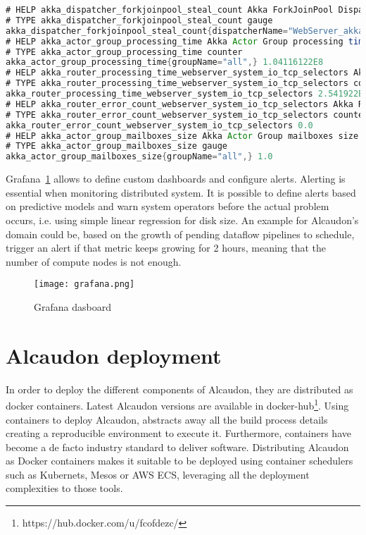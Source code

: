 \begin{lstlisting}[language=scala, frame=trBL, label=code:metricsSample, float=ht, caption = {Example of Alcaudon exposed metrics}]
# HELP akka_dispatcher_forkjoinpool_steal_count Akka ForkJoinPool Dispatcher Steal Count
# TYPE akka_dispatcher_forkjoinpool_steal_count gauge
akka_dispatcher_forkjoinpool_steal_count{dispatcherName="WebServer_akka.actor.default-dispatcher",} 49.0
# HELP akka_actor_group_processing_time Akka Actor Group processing time (Nanos)
# TYPE akka_actor_group_processing_time counter
akka_actor_group_processing_time{groupName="all",} 1.04116122E8
# HELP akka_router_processing_time_webserver_system_io_tcp_selectors Akka Router processing time (Nanos)
# TYPE akka_router_processing_time_webserver_system_io_tcp_selectors counter
akka_router_processing_time_webserver_system_io_tcp_selectors 2.541922E7
# HELP akka_router_error_count_webserver_system_io_tcp_selectors Akka Router errors
# TYPE akka_router_error_count_webserver_system_io_tcp_selectors counter
akka_router_error_count_webserver_system_io_tcp_selectors 0.0
# HELP akka_actor_group_mailboxes_size Akka Actor Group mailboxes size
# TYPE akka_actor_group_mailboxes_size gauge
akka_actor_group_mailboxes_size{groupName="all",} 1.0
\end{lstlisting}

Grafana~\ref{fig:grafana} allows to define custom dashboards and configure
alerts. Alerting is essential when monitoring distributed system. It is possible
to define alerts based on predictive models and warn system operators before
the actual problem occurs, i.e. using simple linear regression for disk
size. An example for Alcaudon's domain could be, based on the growth of pending
dataflow pipelines to schedule, trigger an alert if that metric keeps growing for
2 hours, meaning that the number of compute nodes is not enough.

\begin{figure}[!h]
\begin{center}
\texttt{[image: grafana.png]}
\caption{Grafana dasboard}
\label{fig:grafana}
\end{center}
\end{figure}

\section{Alcaudon deployment}

In order to deploy the different components of Alcaudon, they are distributed as
docker containers. Latest Alcaudon versions are available in
docker-hub\footnote{https://hub.docker.com/u/fcofdezc/}. Using containers to
deploy Alcaudon, abstracts away all the build process details creating a
reproducible environment to execute it. Furthermore, containers have become a de
facto industry standard to deliver software. Distributing Alcaudon as Docker
containers makes it suitable to be deployed using container schedulers such as
Kubernets, Mesos or AWS ECS, leveraging all the deployment complexities to those
tools.

